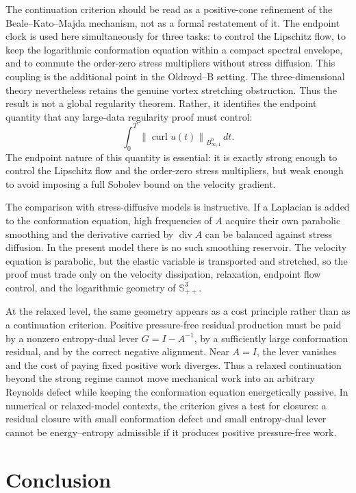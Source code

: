 \documentclass[11pt]{article}
\numberwithin{equation}{section}
\newcommand{\Id}{I}
\newcommand{\Spp}{\mathbb S_{++}}
\newcommand{\divv}{\operatorname{div}}
\newcommand{\curl}{\operatorname{curl}}
\newcommand{\norm}[1]{\left\lVert #1\right\rVert}
\begin{document}
The continuation criterion should be read as a positive-cone refinement of the
Beale--Kato--Majda mechanism, not as a formal restatement of it.  The endpoint
clock is used here simultaneously for three tasks: to control the Lipschitz
flow, to keep the logarithmic conformation equation within a compact spectral
envelope, and to commute the order-zero stress multipliers without stress
diffusion.  This coupling is the additional point in the Oldroyd--B setting.
The three-dimensional theory nevertheless retains the genuine vortex stretching
obstruction.  Thus the result is not a global regularity theorem.  Rather, it
identifies the endpoint quantity that any large-data regularity proof must
control:
\[
  \int_0^T\norm{\curl u(t)}_{B^0_{\infty,1}}\,dt.
\]
The endpoint nature of this quantity is essential: it is exactly strong enough
to control the Lipschitz flow and the order-zero stress multipliers, but weak
enough to avoid imposing a full Sobolev bound on the velocity gradient.

The comparison with stress-diffusive models is instructive.  If a Laplacian is
added to the conformation equation, high frequencies of \(A\) acquire their own
parabolic smoothing and the derivative carried by \(\divv A\) can be balanced
against stress diffusion.  In the present model there is no such smoothing
reservoir.  The velocity equation is parabolic, but the elastic variable is
transported and stretched, so the proof must trade only on the velocity
dissipation, relaxation, endpoint flow control, and the logarithmic geometry of
\(\Spp^3\).

At the relaxed level, the same geometry appears as a cost principle rather
than as a continuation criterion.  Positive pressure-free residual production
must be paid by a nonzero entropy-dual lever \(G=\Id-A^{-1}\), by a sufficiently
large conformation residual, and by the correct negative alignment.  Near
\(A=\Id\), the lever vanishes and the cost of paying fixed positive work
diverges.  Thus a relaxed continuation beyond the strong regime cannot move
mechanical work into an arbitrary Reynolds defect while keeping the
conformation equation energetically passive.  In numerical or relaxed-model
contexts, the criterion gives a test for closures: a residual closure with
small conformation defect and small entropy-dual lever cannot be
energy--entropy admissible if it produces positive pressure-free work.

\section{Conclusion}
\end{document}
